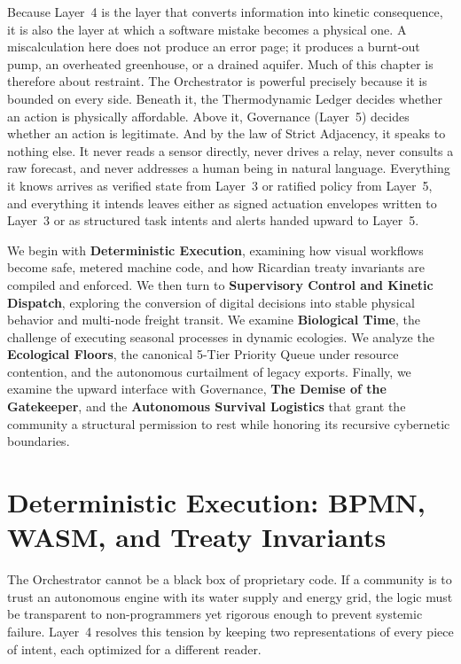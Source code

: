 Because Layer~4 is the layer that converts information into kinetic consequence, it is also the layer at which a software mistake becomes a physical one. A miscalculation here does not produce an error page; it produces a burnt-out pump, an overheated greenhouse, or a drained aquifer. Much of this chapter is therefore about restraint. The Orchestrator is powerful precisely because it is bounded on every side. Beneath it, the Thermodynamic Ledger decides whether an action is physically affordable. Above it, Governance (Layer~5) decides whether an action is legitimate. And by the law of Strict Adjacency, it speaks to nothing else. It never reads a sensor directly, never drives a relay, never consults a raw forecast, and never addresses a human being in natural language. Everything it knows arrives as verified state from Layer~3 or ratified policy from Layer~5, and everything it intends leaves either as signed actuation envelopes written to Layer~3 or as structured task intents and alerts handed upward to Layer~5.

We begin with \textbf{Deterministic Execution}, examining how visual workflows become safe, metered machine code, and how Ricardian treaty invariants are compiled and enforced. We then turn to \textbf{Supervisory Control and Kinetic Dispatch}, exploring the conversion of digital decisions into stable physical behavior and multi-node freight transit. We examine \textbf{Biological Time}, the challenge of executing seasonal processes in dynamic ecologies. We analyze the \textbf{Ecological Floors}, the canonical 5-Tier Priority Queue under resource contention, and the autonomous curtailment of legacy exports. Finally, we examine the upward interface with Governance, \textbf{The Demise of the Gatekeeper}, and the \textbf{Autonomous Survival Logistics} that grant the community a structural permission to rest while honoring its recursive cybernetic boundaries.

\section{Deterministic Execution: BPMN, WASM, and Treaty Invariants}

The Orchestrator cannot be a black box of proprietary code. If a community is to trust an autonomous engine with its water supply and energy grid, the logic must be transparent to non-programmers yet rigorous enough to prevent systemic failure. Layer~4 resolves this tension by keeping two representations of every piece of intent, each optimized for a different reader.


